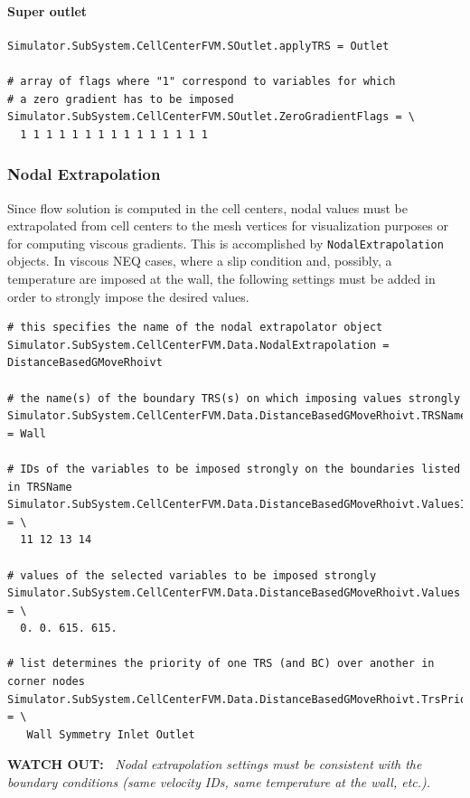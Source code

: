 \documentclass[11pt]{article}
\begin{document}
\paragraph{Super outlet}

\begin{lstlisting}[breaklines]
Simulator.SubSystem.CellCenterFVM.SOutlet.applyTRS = Outlet

# array of flags where "1" correspond to variables for which 
# a zero gradient has to be imposed
Simulator.SubSystem.CellCenterFVM.SOutlet.ZeroGradientFlags = \
  1 1 1 1 1 1 1 1 1 1 1 1 1 1 1
\end{lstlisting}

\subsubsection{Nodal Extrapolation}

Since flow solution is computed in the cell centers, nodal values must be extrapolated from cell centers 
to the mesh vertices for visualization purposes or for computing viscous gradients. This is accomplished by 
{\tt NodalExtrapolation} objects. In viscous NEQ cases, where a slip condition and, possibly, a temperature 
are imposed at the wall, the following settings must be added in order to strongly impose the desired values.

\begin{lstlisting}[breaklines]
# this specifies the name of the nodal extrapolator object
Simulator.SubSystem.CellCenterFVM.Data.NodalExtrapolation = DistanceBasedGMoveRhoivt

# the name(s) of the boundary TRS(s) on which imposing values strongly 
Simulator.SubSystem.CellCenterFVM.Data.DistanceBasedGMoveRhoivt.TRSName = Wall

# IDs of the variables to be imposed strongly on the boundaries listed in TRSName
Simulator.SubSystem.CellCenterFVM.Data.DistanceBasedGMoveRhoivt.ValuesIdx = \
  11 12 13 14

# values of the selected variables to be imposed strongly
Simulator.SubSystem.CellCenterFVM.Data.DistanceBasedGMoveRhoivt.Values = \
  0. 0. 615. 615.

# list determines the priority of one TRS (and BC) over another in corner nodes
Simulator.SubSystem.CellCenterFVM.Data.DistanceBasedGMoveRhoivt.TrsPriorityList = \
   Wall Symmetry Inlet Outlet
\end{lstlisting}

{\bf WATCH OUT:~} {\it Nodal extrapolation settings must be consistent with the boundary conditions (same velocity IDs, same temperature at the wall, etc.).}
\end{document}
